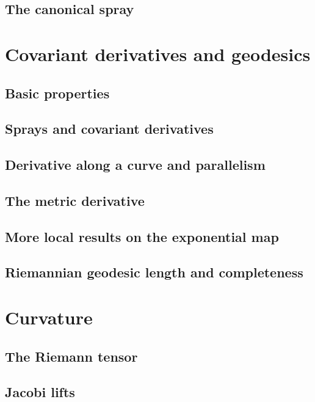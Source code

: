\documentclass[a4paper]{article}
\begin{document}
\subsection{The canonical spray}

\section{Covariant derivatives and geodesics}

\subsection{Basic properties}

\subsection{Sprays and covariant derivatives}

\subsection{Derivative along a curve and parallelism}

\subsection{The metric derivative}

\subsection{More local results on the exponential map}

\subsection{Riemannian geodesic length and completeness}

\section{Curvature}

\subsection{The Riemann tensor}

\subsection{Jacobi lifts}
\end{document}
